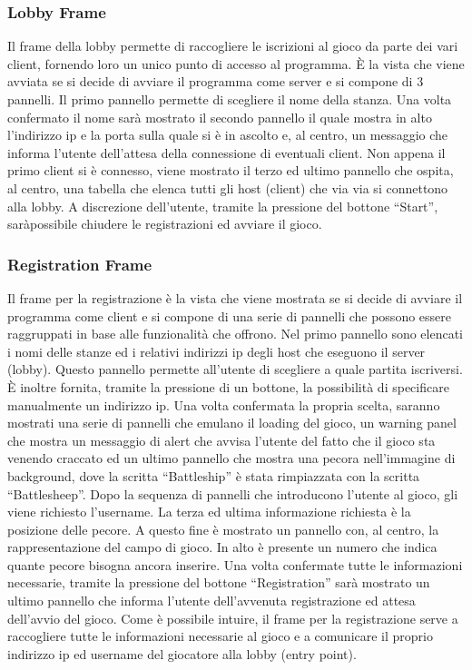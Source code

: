 \subsubsection{Lobby Frame}
\label{subsubsection:progettazione_lobby_frame}
Il frame della lobby permette di raccogliere le iscrizioni al gioco da parte dei
vari client, fornendo loro un unico punto di accesso al programma. È la vista
che viene avviata se si decide di avviare il programma come server e si compone
di 3 pannelli.\newline
Il primo pannello permette di scegliere il nome della stanza. Una volta
confermato il nome sarà mostrato il secondo pannello il quale mostra in alto
l'indirizzo ip e la porta sulla quale si è in ascolto e, al centro, un messaggio
che informa l'utente dell'attesa della connessione di eventuali client. Non
appena il primo client si è connesso, viene mostrato il terzo ed ultimo pannello
che ospita, al centro, una tabella che elenca tutti gli host (client) che via
via si connettono alla lobby. A discrezione dell'utente, tramite la pressione
del bottone ``Start'', saràpossibile chiudere le registrazioni ed avviare il
gioco.



\subsubsection{Registration Frame}
\label{subsubsection:progettazione_registration_frame}
Il frame per la registrazione è la vista che viene mostrata se si decide di
avviare il programma come client e si compone di una serie di pannelli che
possono essere raggruppati in base alle funzionalità che offrono.\newline
Nel primo pannello sono elencati i nomi delle stanze ed i relativi indirizzi ip
degli host che eseguono il server (lobby). Questo pannello permette all'utente
di scegliere a quale partita iscriversi. È inoltre fornita, tramite la pressione
di un bottone, la possibilità di specificare manualmente un indirizzo ip. Una
volta confermata la propria scelta, saranno mostrati una serie di pannelli che
emulano il loading del gioco, un warning panel che mostra un messaggio di alert
che avvisa l'utente del fatto che il gioco sta venendo craccato ed un ultimo
pannello che mostra una pecora nell'immagine di background, dove la scritta
``Battleship'' è stata rimpiazzata con la scritta ``Battlesheep''. Dopo la
sequenza di pannelli che introducono l'utente al gioco, gli viene richiesto
l'username. La terza ed ultima informazione richiesta è la posizione delle
pecore. A questo fine è mostrato un pannello con, al centro, la rappresentazione
del campo di gioco. In alto è presente un numero che indica quante pecore
bisogna ancora inserire. Una volta confermate tutte le informazioni necessarie,
tramite la pressione del bottone ``Registration'' sarà mostrato un ultimo
pannello che informa l'utente dell'avvenuta registrazione ed attesa dell'avvio
del gioco.\newline
Come è possibile intuire, il frame per la registrazione serve a raccogliere
tutte le informazioni necessarie al gioco e a comunicare il proprio indirizzo
ip ed username del giocatore alla lobby (entry point).




